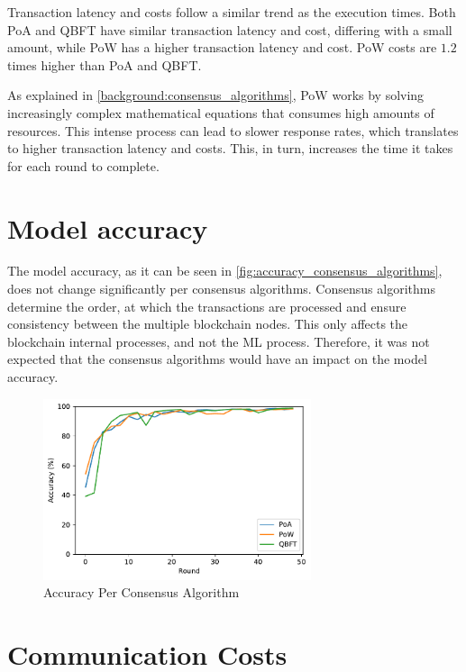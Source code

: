 Transaction latency and costs follow a similar trend as the execution times. Both PoA and QBFT have similar transaction latency and cost, differing with a small amount, while PoW has a higher transaction latency and cost. PoW costs are $1.2$ times higher than PoA and QBFT.

As explained in \autoref{background:consensus_algorithms}, PoW works by solving increasingly complex mathematical equations that consumes high amounts of resources. This intense process can lead to slower response rates, which translates to higher transaction latency and costs. This, in turn, increases the time it takes for each round to complete.

\section{Model accuracy}

The model accuracy, as it can be seen in \autoref{fig:accuracy_consensus_algorithms}, does not change significantly per consensus algorithms. Consensus algorithms determine the order, at which the transactions are processed and ensure consistency between the multiple blockchain nodes. This only affects the blockchain internal processes, and not the ML process. Therefore, it was not expected that the consensus algorithms would have an impact on the model accuracy.

\begin{figure}[!ht]
    \centering
    \centering
    \includegraphics[width=0.7\textwidth]{graphics/consensus/accuracy.pdf}
    \caption{Accuracy Per Consensus Algorithm}
    \label{fig:accuracy_consensus_algorithms}
\end{figure}

\section{Communication Costs}

